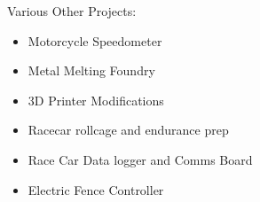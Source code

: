 \documentclass[line,mmmargin]{res}
\begin{document}
\begin{resume}
	\vspace{-10pt}
	{Various Other Projects:}
		\begin{multicols}{2}
			\begin{itemize}
				\itemsep -2pt
				\item[] Motorcycle Speedometer
				\item[] Metal Melting Foundry
				\item[] 3D Printer Modifications
				\item[] Racecar rollcage and endurance prep
				\item[] Race Car Data logger and Comms Board
				\item[] Electric Fence Controller
			\end{itemize}
		\end{multicols}


\end{resume}
\end{document}
